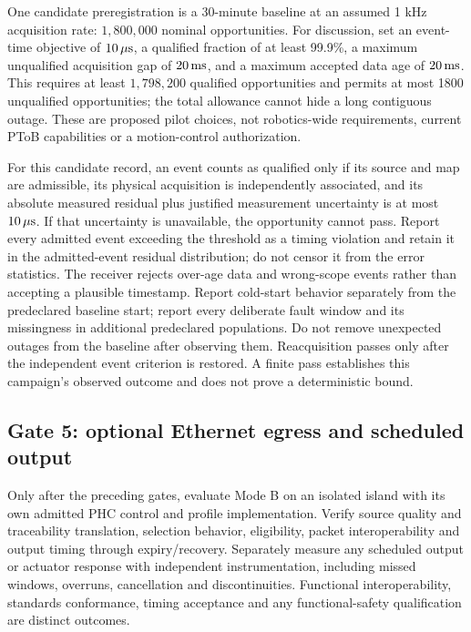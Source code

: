 \documentclass[11pt,letterpaper]{article}
\begin{document}
One candidate preregistration is a 30-minute baseline at an assumed 1 kHz acquisition rate: $1{,}800{,}000$ nominal opportunities. For discussion, set an event-time objective of $10\,\mu\mathrm{s}$, a qualified fraction of at least 99.9\%, a maximum unqualified acquisition gap of $20\,\mathrm{ms}$, and a maximum accepted data age of $20\,\mathrm{ms}$. This requires at least $1{,}798{,}200$ qualified opportunities and permits at most 1800 unqualified opportunities; the total allowance cannot hide a long contiguous outage. These are proposed pilot choices, not robotics-wide requirements, current PToB capabilities or a motion-control authorization.

For this candidate record, an event counts as qualified only if its source and map are admissible, its physical acquisition is independently associated, and its absolute measured residual plus justified measurement uncertainty is at most $10\,\mu\mathrm{s}$. If that uncertainty is unavailable, the opportunity cannot pass. Report every admitted event exceeding the threshold as a timing violation and retain it in the admitted-event residual distribution; do not censor it from the error statistics. The receiver rejects over-age data and wrong-scope events rather than accepting a plausible timestamp. Report cold-start behavior separately from the predeclared baseline start; report every deliberate fault window and its missingness in additional predeclared populations. Do not remove unexpected outages from the baseline after observing them. Reacquisition passes only after the independent event criterion is restored. A finite pass establishes this campaign's observed outcome and does not prove a deterministic bound.

\subsection{Gate 5: optional Ethernet egress and scheduled output}
Only after the preceding gates, evaluate Mode B on an isolated island with its own admitted PHC control and profile implementation. Verify source quality and traceability translation, selection behavior, eligibility, packet interoperability and output timing through expiry/recovery. Separately measure any scheduled output or actuator response with independent instrumentation, including missed windows, overruns, cancellation and discontinuities. Functional interoperability, standards conformance, timing acceptance and any functional-safety qualification are distinct outcomes.
\end{document}
